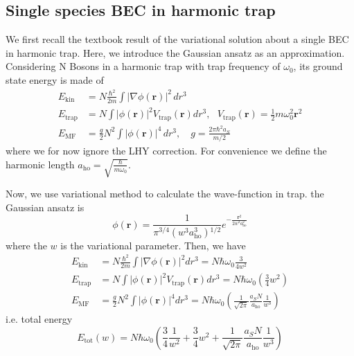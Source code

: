 \subsection{Single species BEC in harmonic trap}

We first recall the textbook result of the variational solution about a single BEC in harmonic trap. Here, we introduce the Gaussian ansatz as an approximation. Considering N Bosons in a harmonic trap with trap frequency of $\omega _0$, its ground state energy is made of 
\begin{equation}
\begin{split}
E_{\text{kin}}&=N \frac{\hbar ^2}{2m}\int \left| \nabla \phi (\pmb{r})\right| ^2 \, dr^3\\
E_{\text{trap}}&=N\int \left| \phi (\pmb{r})\right| ^2V_{\text{trap}}(\pmb{r})dr^3,\text{   }V_{\text{trap}}(\pmb{r})=\frac{1}{2}m \omega _0^2\pmb{r}^2\\
E_{\text{MF}}&=\frac{g}{2}N^2\int \left| \phi (\pmb{r})\right| ^4 \, dr^3,\quad g=\frac{2\pi  \hbar ^2a_S}{m/2}
\end{split}
\end{equation}
where we for now ignore the LHY correction. For convenience we define the harmonic length $a_{\text{ho}}=\sqrt{\frac{\hbar }{m \omega _0}}$.

Now, we use variational method to calculate the wave-function in trap. the Gaussian ansatz is 
\begin{equation}
\phi (\pmb{r})=\frac{1}{\pi^{3/4}\left(w^3a_{\text{ho}}^3\right){}^{1/2}}e^{-\frac{\pmb{r}^2}{2w^2a_{\text{ho}}^2}}
\end{equation}
where the $w$ is the variational parameter. Then, we have
\begin{equation}
\begin{split}
E_{\text{kin}}&=N \frac{\hbar^2}{2m}\int \left|\nabla\phi(\pmb{r})\right|^2 dr^3=N\hbar\omega_0\frac{3}{4w^2}\\
E_{\text{trap}}&=N\int\left|\phi(\pmb{r})\right| ^2 V_{\text{trap}}(\pmb{r})dr^3 = N\hbar\omega_0\left(\frac{3}{4} w^2\right)\\
E_{\text{MF}}&=\frac{g}{2}N^2\int\left|\phi(\pmb{r})\right|^4dr^3=N \hbar\omega_0\left(\frac{1}{\sqrt{2\pi}}\frac{a_SN}{a_{\text{ho}}}\frac{1}{w^3}\right)
\end{split}
\end{equation}
i.e. total energy 
\begin{equation}
E_{\text{tot}}(w)=N\hbar\omega_0\left(\frac{3}{4}\frac{1}{w^2}+\frac{3}{4}w^2+\frac{1}{\sqrt{2\pi}}\frac{a_SN}{a_{\text{ho}}}\frac{1}{w^3}\right)
\end{equation}

